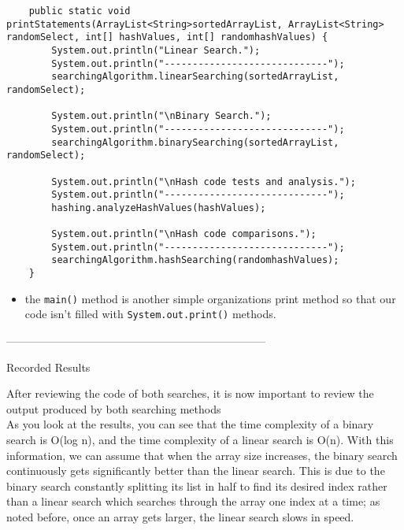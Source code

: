 \documentclass{article}
\begin{document}
\begin{verbatim}
    public static void printStatements(ArrayList<String>sortedArrayList, ArrayList<String> randomSelect, int[] hashValues, int[] randomhashValues) {
        System.out.println("Linear Search.");
        System.out.println("-----------------------------");
        searchingAlgorithm.linearSearching(sortedArrayList, randomSelect);
                
        System.out.println("\nBinary Search.");
        System.out.println("-----------------------------");
        searchingAlgorithm.binarySearching(sortedArrayList, randomSelect);
        
        System.out.println("\nHash code tests and analysis.");
        System.out.println("-----------------------------");
        hashing.analyzeHashValues(hashValues);
        
        System.out.println("\nHash code comparisons.");
        System.out.println("-----------------------------");
        searchingAlgorithm.hashSearching(randomhashValues);
    }
\end{verbatim}

\begin{itemize}

\item the \verb|main()| method is another simple organizations print method so that our code isn't filled with \verb|System.out.print()| methods.\\

\end{itemize}

\pagebreak


\begin{center}
    -----------------------------------------------------------------------
\end{center}

\begin{center}
\begin{large}
    Recorded Results
\end{large}
\end{center}



After reviewing the code of both searches, it is now important to review the output produced by both searching methods\\

As you look at the results, you can see that the time complexity of a binary search is O(log n), and the time complexity of a linear search is O(n). With this information, we can assume that when the array size increases, the binary search continuously gets significantly better than the linear search. This is due to the binary search constantly splitting its list in half to find its desired index rather than a linear search which searches through the array one index at a time; as noted before, once an array gets larger, the linear search slows in speed.\\
\end{document}
